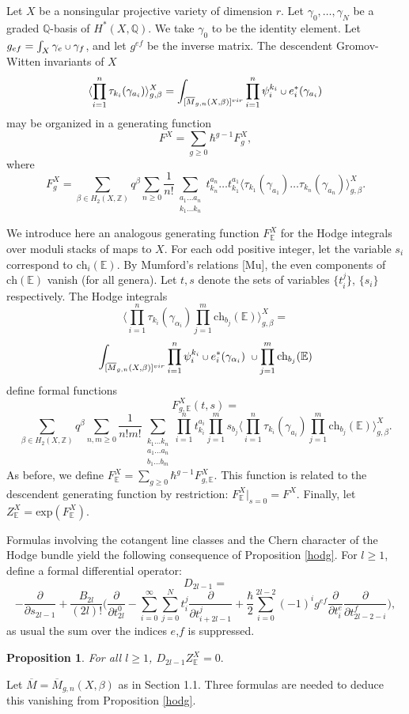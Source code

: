 \documentclass[11 pt]{amsart}
\newtheorem{pr}{Proposition}
\newcommand{\Q}{\mathbb{Q}}
\newcommand{\Z}{\mathbb{Z}}
\newcommand{\lan}{\langle}
\newcommand{\ran}{\rangle}
\newcommand{\mgn}{\overline{M}_{g,n}}
\def\scup{\mathbin{\text{\scriptsize$\cup$}}}
\newcommand{\bpf}{\noindent {\em Proof.} }
\newcommand{\hodge}{\mathbb{E}}
\newcommand{\ch}{\text{ch}}
\begin{document}
Let $X$ be a nonsingular projective variety of dimension $r$.  
Let $\gamma_0, \ldots, \gamma_N$ be a graded $\Q$-basis of
$H^*(X, \Q)$. We take $\gamma_0$ to be the identity element.
Let $g_{ef}= \int_X \gamma_e\scup \gamma_f$, and
let $g^{ef}$ be the inverse matrix.
The 
descendent
Gromov-Witten invariants of $X$
$$\lan  \prod_{i=1}^n \tau_{k_i}(\gamma_{a_i}) \ran_{g,\beta}^X =
\int_{[\mgn(X,\beta)]^{vir}} 
\prod_{i=1}^n \psi_i^{k_i} \scup e_i^*(\gamma_{a_i})$$
may be organized in a generating function
\begin{equation*}
F^X = \sum_{g\ge 0} \hbar^{g-1} F^X_g,
\end{equation*}
where
$$
F_g^X = \sum_{\beta \in H_2(X,\Z)} q^\beta \sum_{n\ge 0} \frac{1}{n!}
\sum_{\substack{a_1\dots a_n \\ k_1 \dots k_n}} t_{k_n}^{a_n} \dots
t_{k_1}^{a_1} \lan \tau_{k_1}(\gamma_{a_1}) \dots \tau_{k_n}(\gamma_{a_n})
\ran_{g,\beta}^X. 
$$



We introduce here an analogous
generating function $F^X_{\hodge}$ for the Hodge integrals
over moduli stacks of maps to $X$.
For each odd positive integer, let the
variable $s_i$ correspond to $\ch_i (\hodge)$. By Mumford's
relations [Mu], the even components of $\ch(\hodge)$
vanish (for all genera).
Let $t,s$ denote the sets of variables $\{t_i^j\}$, $\{s_i\}$
respectively.
The Hodge integrals
$$\lan  \prod_{i=1}^n \tau_{k_i}(\gamma_{\alpha_i}) 
\prod_{j=1}^{m} \ch_{b_j}(\hodge)  \ran_{g,\beta}^X =$$
$$\int_{[\mgn(X,\beta)]^{vir}} 
\prod_{i=1}^n \psi_i^{k_i} \scup e_i^*(\gamma_{\alpha_i})
\ \scup \prod_{j=1}^{m}  \ch_{b_j}(\hodge)$$
define formal functions
$$F^X_{g,\hodge} (t,s) =$$ 
$$\sum_{\beta \in H_2(X,\Z)} q^\beta \sum_{n,m\ge 0} \frac{1}{n!m!}
\sum_{\substack{k_1 \dots k_n \\ a_1 \dots a_n
\\ b_1  \dots b_m}} 
\prod_{i=1}^n
t_{k_i}^{a_i}
\prod_{j=1}^m s_{b_j} \lan 
\prod_{i=1}^n\tau_{k_i}(\gamma_{a_i}) \prod_{j=1}^m \ch_{b_j}(\hodge)
\ran_{g,\beta}^X.$$
As before, we define
$F^X_\hodge = \sum_{g\ge 0} \hbar^{g-1} F^X_{g, \hodge}.$
This function is related to the descendent generating function
by restriction: $F^X_\hodge | _{s=0} = F^X$.
Finally, 
let $Z^X_\hodge= \text{exp}(F^X_\hodge)$.

Formulas involving the cotangent line classes 
and the Chern character of the Hodge bundle
yield
the following consequence of Proposition \ref{hodg}.
For $l \geq 1$, define a formal differential
operator:
$$D_{2l-1} = $$
$$-\frac{\partial}{\partial{s_{2l-1}}}  
+\frac{B_{2l}}{(2l)!} \Big(\frac{\partial}{\partial {t^0_{2l}}} 
- \sum_{i=0}^{\infty} \sum_{j=0}^{N}
t_i^j \frac{\partial}{\partial t_{i+2l-1}^{j}}
+\frac{\hbar}{2}
\sum_{i=0}^{2l-2} (-1)^i g^{ef} \frac{\partial}{\partial t_{i}^e }
\frac{\partial}{\partial t_{2l-2-i}^f}\Big),$$
as usual the sum over the indices $e$,$f$ is suppressed.
\begin{pr} \label{diff}
For all $l\geq 1$,
$D_{2l-1} Z^X_\hodge =0.$
\end{pr}
\bpf
Let $\overline{M}= \overline{M}_{g,n}(X,\beta)$ as in
Section 1.1. 
Three formulas are needed to deduce this vanishing from
Proposition \ref{hodg}.
\end{document}

